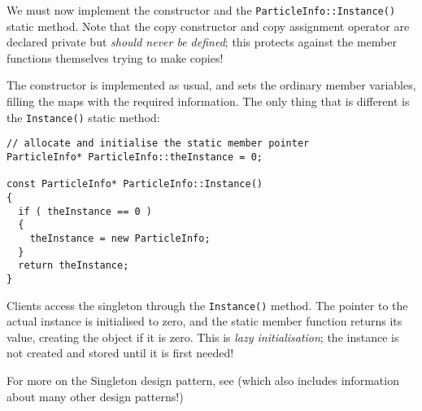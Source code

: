\documentclass[a4paper]{scrartcl}
\begin{document}
We must now implement the constructor and the \verb|ParticleInfo::Instance()| static method. Note that the copy constructor and copy assignment operator are declared private but \emph{should never be defined}; this protects against the member functions themselves trying to make copies!

The constructor is implemented as usual, and sets the ordinary member variables, filling the maps with the required information. The only thing that is different is the \verb|Instance()| static method:

\begin{verbatim}
// allocate and initialise the static member pointer
ParticleInfo* ParticleInfo::theInstance = 0;

const ParticleInfo* ParticleInfo::Instance()
{
  if ( theInstance == 0 )
  {
    theInstance = new ParticleInfo;
  }
  return theInstance;
}
\end{verbatim}

Clients access the singleton through the \verb|Instance()| method. The pointer to the actual instance is initialised to zero, and the static member function returns its value, creating the object if it is zero. This is \emph{lazy initialisation}; the instance is not created and stored until it is first needed!

For more on the Singleton design pattern, see\cite{DesignPatterns} (which also includes information about many other design patterns!)


\end{document}
